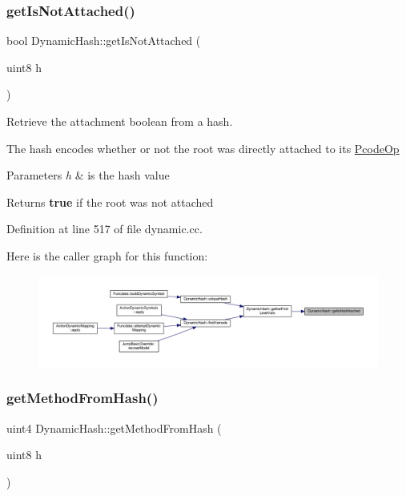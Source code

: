 \subsubsection{\texorpdfstring{getIsNotAttached()}{getIsNotAttached()}}
{\footnotesize\ttfamily bool Dynamic\+Hash\+::get\+Is\+Not\+Attached (\begin{DoxyParamCaption}\item[{uint8}]{h }\end{DoxyParamCaption})\hspace{0.3cm}{\ttfamily [static]}}



Retrieve the attachment boolean from a hash. 

The hash encodes whether or not the root was directly attached to its \mbox{\hyperlink{class_pcode_op}{Pcode\+Op}} 
\begin{DoxyParams}{Parameters}
{\em h} & is the hash value \\
\hline
\end{DoxyParams}
\begin{DoxyReturn}{Returns}
{\bfseries{true}} if the root was not attached 
\end{DoxyReturn}


Definition at line 517 of file dynamic.\+cc.

Here is the caller graph for this function\+:
\nopagebreak
\begin{figure}[H]
\begin{center}
\leavevmode
\includegraphics[width=350pt]{class_dynamic_hash_a670928958cd93677cc459e9b4f063fd3_icgraph}
\end{center}
\end{figure}
\mbox{\label{class_dynamic_hash_a0f43ee0fdfcd0ad103fc7125cc8d5ad0}} 
\subsubsection{\texorpdfstring{getMethodFromHash()}{getMethodFromHash()}}
{\footnotesize\ttfamily uint4 Dynamic\+Hash\+::get\+Method\+From\+Hash (\begin{DoxyParamCaption}\item[{uint8}]{h }\end{DoxyParamCaption})\hspace{0.3cm}{\ttfamily [static]}}



